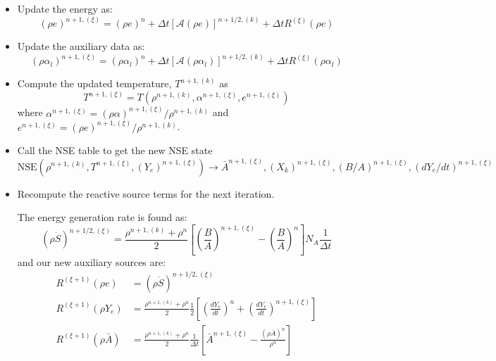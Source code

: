 \documentclass[times,modern]{aastex63}
\newcommand{\Sdot}{\dot{S}}
\newcommand{\Advss}[1]{{\left [{\mathcal{{A}}} \left(#1\right)\right]}}
\newcommand{\nse}[1]{{\mathrm{NSE}( #1 )}}
\begin{document}
\begin{itemize}
\item Update the energy as:
   \begin{equation}
     (\rho e)^{n+1,(\xi)} = (\rho e)^n + \Delta t \Advss{\rho e}^{n+1/2,(k)} + \Delta t R^{(\xi)}(\rho e)
   \end{equation}

\item Update the auxiliary data as:
   \begin{equation}
     (\rho \alpha_l)^{n+1,(\xi)} = (\rho \alpha_l)^n + \Delta t \Advss{\rho \alpha_l}^{n+1/2,(k)} + \Delta t R^{(\xi)}(\rho \alpha_l)
   \end{equation}

\item Compute the updated temperature, $T^{n+1,(k)}$ as
  \begin{equation}
    T^{n+1,(\xi)} = T(\rho^{n+1,(k)},  \alpha^{n+1,(\xi)},  e^{n+1,(\xi)})
  \end{equation}
  where $\alpha^{n+1,(\xi)} = (\rho  \alpha)^{n+1,(\xi)} / \rho^{n+1,(k)}$ and $e^{n+1,(\xi)} = (\rho e)^{n+1,(\xi)} / \rho^{n+1,(k)}$.

\item Call the NSE table to get the new NSE state
  \begin{equation}
    \nse{\rho^{n+1,(k)}, T^{n+1,(\xi)}, (Y_e)^{n+1,(\xi)}} \rightarrow \bar{A}^{n+1,(\xi)}, (X_k)^{n+1,(\xi)}, (B/A)^{n+1,(\xi)}, (dY_e/dt)^{n+1,(\xi)}
  \end{equation}

\item Recompute the reactive source terms for the next iteration.

  The energy generation rate is found as:
  \begin{equation}
    (\rho \Sdot)^{n+1/2,(\xi)} = \frac{\rho^{n+1,(k)} + \rho^n}{2}
    \left [ \left ( \frac{B}{A} \right )^{n+1,(\xi)} -
      \left ( \frac{B}{A} \right )^n \right ] N_A \frac{1}{\Delta t}
  \end{equation}
  and our new auxiliary sources are:
\begin{align}
R^{(\xi+1)}(\rho e) &= (\rho \Sdot)^{n+1/2,(\xi)} \\
R^{(\xi+1)}(\rho Y_e) &= \frac{\rho^{n+1,(k)} + \rho^n}{2} \frac{1}{2} \left [ \left (\frac{dY_e}{dt} \right )^n + \left (\frac{dY_e}{dt} \right )^{n+1,(\xi)} \right ] \\
R^{(\xi+1)}(\rho \bar{A}) &= \frac{\rho^{n+1,(k)} + \rho^n}{2} \frac{1}{\Delta t} \left [ \bar{A}^{n+1,(\xi)} - \frac{(\rho \bar{A})^n}{\rho^n} \right ]
\end{align}

\end{itemize}
\end{document}
